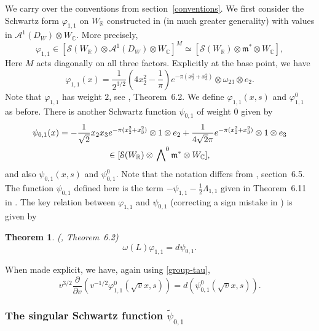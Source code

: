 \documentclass[12pt,leqno]{amsart}
\numberwithin{equation}{section}
\theoremstyle{plain}
\newtheorem{theorem}{Theorem}[section]
\theoremstyle{definition}
\theoremstyle{remark}
\newcommand{\R}{\mathbb{R}}
\newcommand{\C}{\mathbb{C}}
\newcommand{\wwedge}[1]{\sideset{}{^{#1}}\bigwedge}
\newcommand{\calA}{\mathcal{A}}
\newcommand{\calS}{\mathcal{S}}
\begin{document}
We carry over the conventions from section~\ref{conventions}. We first consider the Schwartz form $\varphi_{1,1}$ on $W_{\R}$ constructed in \cite{FMcoeff} (in much greater generality) with values in $\calA^1(D_W) \otimes W_{\C}$. More precisely,
\[
\varphi_{1,1} \in [\calS(W_{\R}) \otimes \calA^1(D_W) \otimes W_{\C}]^M \simeq
[\calS(W_{\R}) \otimes \mathfrak{m}^{\ast} \otimes W_{\C}],
\]
Here $M$ acts diagonally on all three factors. Explicitly at the base point, we have
\begin{equation*}
\varphi_{1,1}(x) = \frac{1}{2^{3/2}} \left(4 x_2^2-\frac1{\pi}\right) e^{-\pi (x_2^2+x_3^2)} \otimes \omega_{23} \otimes e_2.
\end{equation*}
Note that $\varphi_{1,1}$ has weight $2$, see \cite{FMcoeff}, Theorem~6.2. We define $\varphi_{1,1}(x,s)$ and $\varphi_{1,1}^0$ as before. There is another Schwartz function $\psi_{0,1}$ of weight $0$ given by
\begin{multline*}
\psi_{0,1}(x) =   -\frac1{\sqrt{2}} x_2x_3 e^{-\pi(x_2^2+x_3^2)}  \otimes 1 \otimes e_2 + \frac{1}{4\sqrt{2}\pi} e^{-\pi(x_2^2+x_3^2)} \otimes 1\otimes e_3 \\ \in
[\calS(W_{\R}) \otimes \wwedge{0} \mathfrak{m}^{\ast} \otimes W_{\C}],
\end{multline*}
and also $\psi_{0,1}(x,s)$ and $\psi_{0,1}^0$. Note that the notation differs from \cite{FMcoeff}, section~6.5. The function $\psi_{0,1}$ defined here is the term $-\psi_{1,1} - \tfrac12 \Lambda_{1,1}$ given in Theorem~6.11 in \cite{FMcoeff}. 
The key relation between $\varphi_{1,1}$ and $\psi_{0,1}$ (correcting a sign mistake in \cite{FMcoeff}) is given by

\begin{theorem}(\cite{FMcoeff}, Theorem~6.2\label{Millson})\label{localholW}
\[
\omega(L) \varphi_{1,1} = d \psi_{0,1}.
\]
\end{theorem}

When made explicit, we have, again using \eqref{group-tau},
\begin{equation}
v^{3/2} \frac{\partial}{\partial v } \left(v^{-1/2} \varphi_{1,1}^0(\sqrt{v}x,s) \right)=  d
\left(\psi_{0,1}^0(\sqrt{v}x,s)\right).
\end{equation}



\subsubsection{The singular Schwartz function $\tilde{\psi}_{0,1}$}
\end{document}
